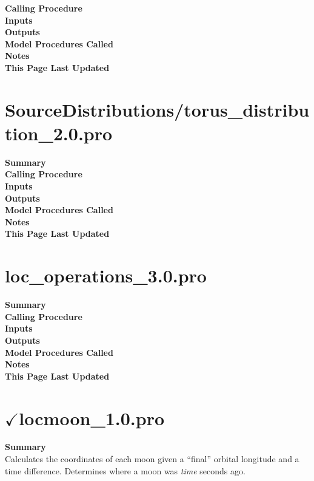 \documentclass[11pt]{article}
\newcommand\descrip[1]{\textsf{\textbf{\large{#1}}}\\}
\begin{document}
\descrip{Calling Procedure}

\descrip{Inputs}

\descrip{Outputs}

\descrip{Model Procedures Called}

\descrip{Notes}

\descrip{This Page Last Updated}

\clearpage

\section{SourceDistributions/torus\_distribution\_2.0.pro}
\label{sec:torus_distribution}

\descrip{Summary}

\descrip{Calling Procedure}

\descrip{Inputs}

\descrip{Outputs}

\descrip{Model Procedures Called}

\descrip{Notes}

\descrip{This Page Last Updated}

\clearpage

\section{loc\_operations\_3.0.pro} \label{sec:loc_operations}

\descrip{Summary}

\descrip{Calling Procedure}

\descrip{Inputs}

\descrip{Outputs}

\descrip{Model Procedures Called}

\descrip{Notes}

\descrip{This Page Last Updated}

\clearpage

\section{$\checkmark$locmoon\_1.0.pro} \label{sec:locmoon}

\descrip{Summary}
Calculates the coordinates of each moon given a ``final'' orbital longitude and
a time difference. Determines where a moon was \textit{time} seconds ago.
\end{document}
